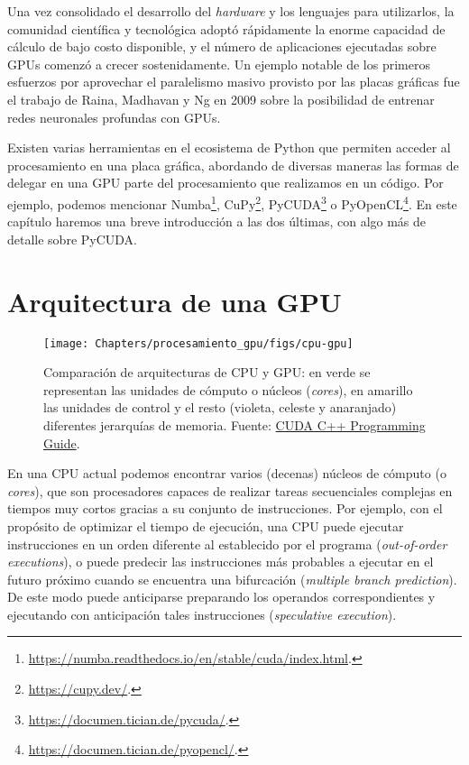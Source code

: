 Una vez consolidado el desarrollo del \textit{hardware} y los lenguajes para utilizarlos, la comunidad científica y tecnológica adoptó rápidamente la enorme capacidad de cálculo de bajo costo disponible, y el número de aplicaciones ejecutadas sobre GPUs comenzó a crecer sostenidamente. Un ejemplo notable de los primeros esfuerzos por aprovechar el paralelismo masivo provisto por las placas gráficas fue el trabajo de Raina, Madhavan y Ng en 2009 sobre la posibilidad de entrenar redes neuronales profundas con GPUs\cite{raina2009}.

Existen varias herramientas en el ecosistema de  Python que permiten acceder al procesamiento en una placa gráfica, abordando de diversas maneras las formas de delegar en una GPU parte del procesamiento que realizamos en un código. Por ejemplo, podemos mencionar Numba\footnote{\url{https://numba.readthedocs.io/en/stable/cuda/index.html}.}, CuPy\footnote{\url{https://cupy.dev/}.}, PyCUDA\footnote{\url{https://documen.tician.de/pycuda/}.} o PyOpenCL\footnote{\url{https://documen.tician.de/pyopencl/}.}. En este capítulo haremos una breve introducción a las dos últimas, con algo más de detalle sobre PyCUDA.


\section{Arquitectura de una GPU}

\begin{figure}
    \begin{center}
        \texttt{[image: Chapters/procesamiento\_gpu/figs/cpu-gpu]}
    \caption{Comparación de arquitecturas de CPU y GPU: en verde se representan las unidades de cómputo o núcleos (\textit{cores}), en amarillo las unidades de control y el resto (violeta, celeste y anaranjado) diferentes jerarquías de memoria. Fuente: \href{https://docs.nvidia.com/cuda/cuda-c-programming-guide/index.html\#from-graphics-processing-to-general-purpose-parallel-computing-gpu-devotes-more-transistors-to-data-processing}{CUDA C++ Programming Guide}.}
        \label{fig:cpugpu}
    \end{center}
\end{figure}

En una CPU actual podemos encontrar varios (decenas) núcleos de cómputo (o \textit{cores}), que son procesadores capaces de realizar tareas secuenciales complejas en tiempos muy cortos gracias a su conjunto de instrucciones. Por ejemplo, con el propósito de optimizar el tiempo de ejecución, una CPU puede ejecutar instrucciones en un orden diferente al establecido por el programa (\textit{out-of-order executions}), o puede predecir las instrucciones  más probables a ejecutar en el futuro próximo cuando se encuentra una bifurcación (\textit{multiple branch prediction}). De este modo puede anticiparse preparando los operandos correspondientes y ejecutando con anticipación tales instrucciones (\textit{speculative execution}).

